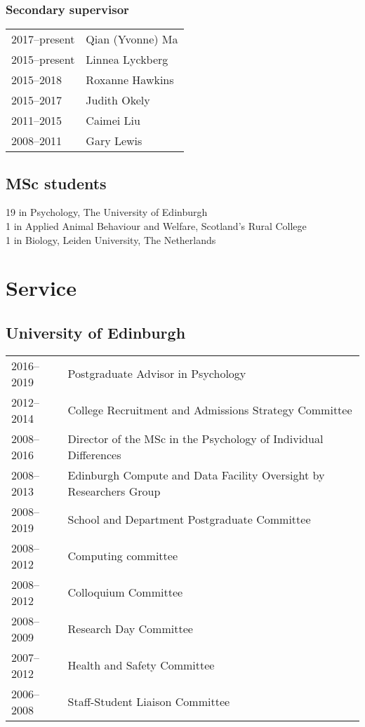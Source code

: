 \documentclass[11pt]{article}
\begin{document}
\subsubsection*{Secondary supervisor}

\begin{tabular}{p{3cm}p{12cm}}
2017--present & Qian (Yvonne) Ma \\
2015--present & Linnea Lyckberg \\
2015--2018 & Roxanne Hawkins \\
2015--2017 & Judith Okely \\
2011--2015 & Caimei Liu \\
2008--2011 & Gary Lewis
\end{tabular}

\subsection*{MSc students}
19 in Psychology, The University of Edinburgh \\
1 in Applied Animal Behaviour and Welfare, Scotland's Rural College \\
1 in Biology, Leiden University, The Netherlands

\section*{Service}
\subsection*{University of Edinburgh}

\begin{tabular}{p{3cm}p{12cm}}
2016--2019 & Postgraduate Advisor in Psychology \\
2012--2014 & College Recruitment and Admissions Strategy Committee \\
2008--2016 & Director of the MSc in the Psychology of Individual
Differences \\
2008--2013 & Edinburgh Compute and Data Facility Oversight by
Researchers Group \\
2008--2019 & School and Department Postgraduate Committee \\
2008--2012 & Computing committee \\
2008--2012 & Colloquium Committee \\
2008--2009 & Research Day Committee \\
2007--2012 & Health and Safety Committee \\
2006--2008 & Staff-Student Liaison Committee
\end{tabular}
\end{document}
